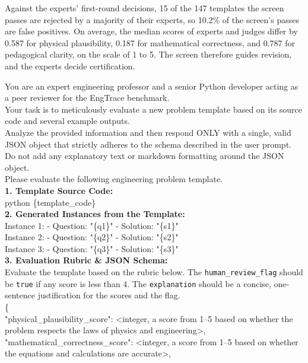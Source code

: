 Against the experts' first-round decisions, 15 of the 147 templates the screen passes are rejected
by a majority of their experts, so 10.2\% of the screen's passes are false positives.
On average, the median scores of experts and judges differ by 0.587 for physical plausibility,
0.187 for mathematical correctness, and 0.787 for pedagogical clarity, on the scale of 1 to 5.
The screen therefore guides revision, and the experts decide certification.

\begin{tcolorbox}[colback=gray!5, colframe=gray!40, boxrule=0.4pt, arc=2pt, left=5pt, right=5pt,
    top=5pt, bottom=5pt, breakable]
\ttfamily\small
You are an expert engineering professor and a senior Python developer acting as a peer reviewer for the EngTrace benchmark.\\
Your task is to meticulously evaluate a new problem template based on its source code and several example outputs.\\
Analyze the provided information and then respond ONLY with a single, valid JSON object that strictly adheres to the schema described in the user prompt. Do not add any explanatory text or markdown formatting around the JSON object.\\[3pt]
Please evaluate the following engineering problem template.\\[3pt]
\textbf{1. Template Source Code:}\\
python \{template\_code\}\\[3pt]
\textbf{2. Generated Instances from the Template:}\\
Instance 1: - Question: "\{q1\}" - Solution: "\{s1\}"\\
Instance 2: - Question: "\{q2\}" - Solution: "\{s2\}"\\
Instance 3: - Question: "\{q3\}" - Solution: "\{s3\}"\\[3pt]
\textbf{3. Evaluation Rubric \& JSON Schema:}\\
Evaluate the template based on the rubric below. The \texttt{human\_review\_flag} should be \texttt{true} if any score is less than 4. The \texttt{explanation} should be a concise, one-sentence justification for the scores and the flag.\\[3pt]
\{\\
\hspace*{1em}"physical\_plausibility\_score": \textless integer, a score from 1--5 based on whether the problem respects the laws of physics and engineering\textgreater,\\
\hspace*{1em}"mathematical\_correctness\_score": \textless integer, a score from 1--5 based on whether the equations and calculations are accurate\textgreater,\\

\end{tcolorbox}
